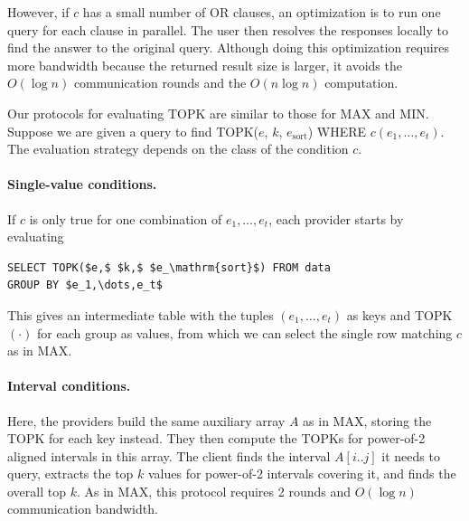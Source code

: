 However, if $c$ has a small number of OR clauses, an optimization is to run
one query for each clause in parallel. The user then resolves
the responses locally to find the answer to the original query.
Although doing this optimization requires more bandwidth because the returned
result size is larger, it avoids the $O(\log n)$ communication rounds and 
the $O(n\log n)$ computation.

\label{sec:topk}
Our protocols for evaluating TOPK are similar to those for MAX and MIN.
Suppose we are given a query to find TOPK($e$, $k$, $e_\mathrm{sort}$) WHERE $c(e_1,\dots,e_t)$.
The evaluation strategy depends on the class of the condition $c$.

\paragraph{Single-value conditions.} If $c$ is only true for one combination
of $e_1,\dots,e_t$, each provider starts by evaluating
\begin{Verbatim}[commandchars=\\\{\},codes={\catcode`$=3\catcode`_=8}]
SELECT TOPK($e,$ $k,$ $e_\mathrm{sort}$) FROM data
GROUP BY $e_1,\dots,e_t$
\end{Verbatim}
This gives an intermediate table with the tuples $(e_1,\dots,e_t)$
as keys and TOPK$(\cdot)$ for each group as values, from which we can select
the single row matching $c$ as in MAX.

\paragraph{Interval conditions.}
Here, the providers build the same auxiliary array $A$ as
in MAX, storing the TOPK for each key instead.
They then compute the TOPKs for power-of-2 aligned intervals in this array.
The client finds the interval $A[i..j]$ it needs to query, extracts the top $k$ values
for power-of-2 intervals covering it, and finds the overall top $k$.
As in MAX, this protocol requires 2 rounds and $O(\log n)$ communication bandwidth.

